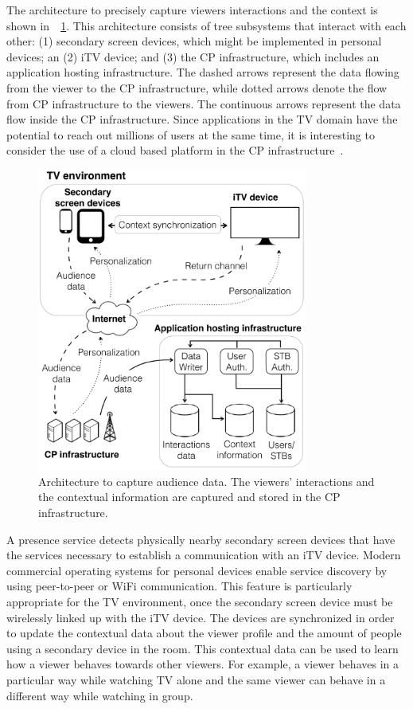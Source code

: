 \documentclass[conference,a4paper]{IEEEtran}
\begin{document}
The architecture to precisely capture viewers interactions and the context is shown in~\figurename~\ref{fig_architecture}. This architecture consists of tree subsystems that interact with each other: (1) secondary screen devices, which might be implemented in personal devices; an (2) iTV device; and (3) the CP infrastructure, which includes an application hosting infrastructure. The dashed arrows represent the data flowing from the viewer to the CP infrastructure, while dotted arrows denote the flow from CP infrastructure to the viewers. The continuous arrows represent the data flow inside the CP infrastructure. Since applications in the TV domain have the potential to reach out millions of users at the same time, it is interesting to consider the use of a cloud based platform in the CP infrastructure~\cite{Lee2010}. 

\begin{figure}[!t]
	\centering
	\includegraphics[width=3.5in]{img/architecture.pdf}
	\caption{Architecture to capture audience data. The viewers' interactions and the contextual information are captured and stored in the CP infrastructure.}
	\label{fig_architecture}
\end{figure}

A presence service detects physically nearby secondary screen devices that have the services necessary to establish a communication with an iTV device. Modern commercial operating systems for personal devices enable service discovery by using peer-to-peer or WiFi communication. This feature is particularly appropriate for the TV environment, once the secondary screen device must be wirelessly linked up with the iTV device. The devices are synchronized in order to update the contextual data about the viewer profile and the amount of people using a secondary device in the room. This contextual data can be used to learn how a viewer behaves towards other viewers. For example, a viewer behaves in a particular way while watching TV alone and the same viewer can behave in a different way while watching in group.
\end{document}
